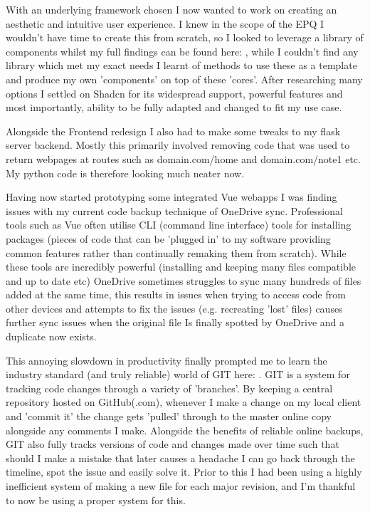 With an underlying framework chosen I now wanted to work on creating an aesthetic and intuitive user experience. I knew in the scope of the EPQ I wouldn't have time to create this from scratch, so I looked to leverage a library of components whilst my full findings can be found here: , while I couldn't find any library which met my exact needs I learnt of methods to use these as a template and produce my own 'components' on top of these 'cores'. After researching many options I settled on Shadcn for its widespread support, powerful features and most importantly, ability to be fully adapted and changed to fit my use case.

Alongside the Frontend redesign I also had to make some tweaks to my flask server backend. Mostly this primarily involved removing code that was used to return webpages at routes such as domain.com/home and domain.com/note1 etc. My python code is therefore looking much neater now.

Having now started prototyping some integrated Vue webapps I was finding issues with my current code backup technique of OneDrive sync. Professional tools such as Vue often utilise CLI (command line interface) tools for installing packages (pieces of code that can be 'plugged in' to my software providing common features rather than continually remaking them from scratch). While these tools are incredibly powerful (installing and keeping many files compatible and up to date etc) OneDrive sometimes struggles to sync many hundreds of files added at the same time, this results in issues when trying to access code from other devices and attempts to fix the issues (e.g. recreating 'lost' files) causes further sync issues when the original file Is finally spotted by OneDrive and a duplicate now exists.

This annoying slowdown in productivity finally prompted me to learn the industry standard (and truly reliable) world of GIT here: . GIT is a system for tracking code changes through a variety of 'branches'. By keeping a central repository hosted on GitHub(.com),  whenever I make a change on my local client and 'commit it' the change gets 'pulled' through to the master online copy alongside any comments I make. Alongside the benefits of reliable online backups, GIT also fully tracks versions of code and changes made over time such that should I make a mistake that later causes a headache I can go back through the timeline, spot the issue and easily solve it. Prior to this I had been using a highly inefficient system of making a new file for each major revision, and I'm thankful to now be using a proper system for this.

